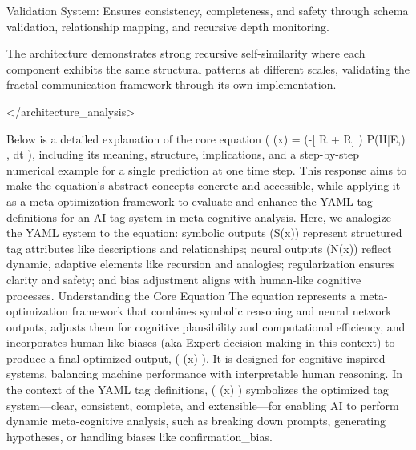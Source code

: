 Validation System: Ensures consistency, completeness, and safety through schema validation, relationship mapping, and recursive depth monitoring.

The architecture demonstrates strong recursive self-similarity where each component exhibits the same structural patterns at different scales, validating the fractal communication framework through its own implementation.

</architecture_analysis>




Below is a detailed explanation of the core equation ( \Psi(x) = \int {} \times \exp\left(-[ R{} +  R{}] \right) \times P(H|E,\beta) , dt ), including its meaning, structure, implications, and a step-by-step numerical example for a single prediction at one time step. This response aims to make the equation’s abstract concepts concrete and accessible, while applying it as a meta-optimization framework to evaluate and enhance the YAML tag definitions for an AI tag system in meta-cognitive analysis. Here, we analogize the YAML system to the equation: symbolic outputs (S(x)) represent structured tag attributes like descriptions and relationships; neural outputs (N(x)) reflect dynamic, adaptive elements like recursion and analogies; regularization ensures clarity and safety; and bias adjustment aligns with human-like cognitive processes.
Understanding the Core Equation The equation represents a meta-optimization framework that combines symbolic reasoning and neural network outputs, adjusts them for cognitive plausibility and computational efficiency, and incorporates human-like biases (aka Expert decision making in this context) to produce a final optimized output, ( \Psi(x) ). It is designed for cognitive-inspired systems, balancing machine performance with interpretable human reasoning. In the context of the YAML tag definitions, ( \Psi(x) ) symbolizes the optimized tag system—clear, consistent, complete, and extensible—for enabling AI to perform dynamic meta-cognitive analysis, such as breaking down prompts, generating hypotheses, or handling biases like confirmation_bias.
